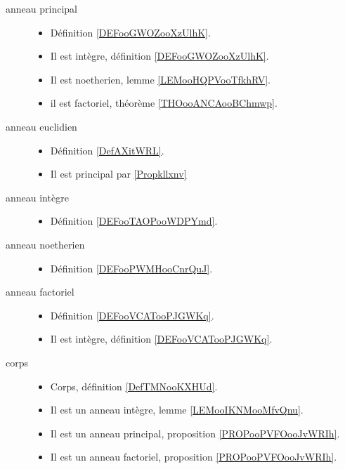 \begin{description}
	\item[anneau principal]\hspace{1cm}
	      \begin{itemize}
		      \item
		            Définition \ref{DEFooGWOZooXzUlhK}.
		      \item
		            Il est intègre, définition \ref{DEFooGWOZooXzUlhK}.
		      \item
		            Il est noetherien, lemme \ref{LEMooHQPVooTfkhRV}.
		      \item
		            il est factoriel, théorème \ref{THOooANCAooBChmwp}.
	      \end{itemize}
	\item[anneau euclidien]\hspace{1cm}
	      \begin{itemize}
		      \item
		            Définition \ref{DefAXitWRL}.
		      \item
		            Il est principal par \ref{Propkllxnv}
	      \end{itemize}
	\item[anneau intègre]\hspace{1cm}
	      \begin{itemize}
		      \item
		            Définition \ref{DEFooTAOPooWDPYmd}.
	      \end{itemize}
	\item[anneau noetherien]\hspace{1cm}
	      \begin{itemize}
		      \item
		            Définition \ref{DEFooPWMHooCnrQuJ}.
	      \end{itemize}
	\item[anneau factoriel]\hspace{1cm}
	      \begin{itemize}
		      \item
		            Définition \ref{DEFooVCATooPJGWKq}.
		      \item
		            Il est intègre, définition \ref{DEFooVCATooPJGWKq}.
	      \end{itemize}
	\item[corps]\hspace{1cm}
	      \begin{itemize}
		      \item
		            Corps, définition \ref{DefTMNooKXHUd}.
		      \item
		            Il est un anneau intègre, lemme \ref{LEMooIKNMooMfvQnu}.
		      \item
		            Il est un anneau principal, proposition \ref{PROPooPVFOooJvWRIh}.
		      \item
		            Il est un anneau factoriel, proposition \ref{PROPooPVFOooJvWRIh}.
	      \end{itemize}
\end{description}

